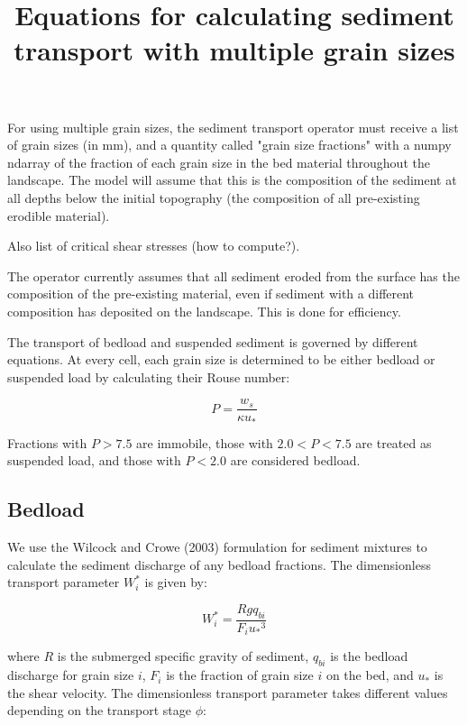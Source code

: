 \documentclass[11pt]{article}
\begin{document}
\title{Equations for calculating sediment transport with multiple grain sizes}
\date{}
\maketitle

For using multiple grain sizes, the sediment transport operator must receive a list of grain sizes (in mm), and a quantity called "grain size fractions" with a numpy ndarray of the fraction of each grain size in the bed material throughout the landscape. The model will assume that this is the composition of the sediment at all depths below the initial topography (the composition of all pre-existing erodible material).

Also list of critical shear stresses (how to compute?).

The operator currently assumes that all sediment eroded from the surface has the composition of the pre-existing material, even if sediment with a different composition has deposited on the landscape. This is done for efficiency.

The transport of bedload and suspended sediment is governed by different equations. At every cell, each grain size is determined to be either bedload or suspended load by calculating their Rouse number:

\begin{equation}
P = \frac{w_s}{\kappa u_*}
\end{equation}

Fractions with $P > 7.5$ are immobile, those with $2.0 < P < 7.5$ are treated as suspended load, and those with $P < 2.0$ are considered bedload.


\subsection{Bedload}

We use the Wilcock and Crowe (2003) formulation for sediment mixtures to calculate the sediment discharge of any bedload fractions. The dimensionless transport parameter $W_i^*$ is given by:

\begin{equation}
W_i^* = \frac{R g q_{bi}}{F_i {u_*}^3}
\end{equation}

\noindent where $R$ is the submerged specific gravity of sediment, $q_{bi}$ is the bedload discharge for grain size $i$, $F_i$ is the fraction of grain size $i$ on the bed, and $u_*$ is the shear velocity. The dimensionless transport parameter takes different values depending on the transport stage $\phi$:
\end{document}
